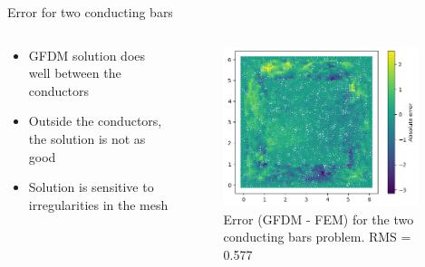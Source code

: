 \documentclass{beamer}
\begin{document}
\begin{frame}{Error for two conducting bars}
\begin{columns}
    \begin{column}{0.5\linewidth}
    \begin{itemize}
        \item GFDM solution does well between the conductors
        \item Outside the conductors, the solution is not as good
        \item Solution is sensitive to irregularities in the mesh
    \end{itemize}
    \end{column}
    \begin{column}{0.5\linewidth}
        \begin{figure}[h]
        \includegraphics[width=0.95\textwidth]{Figures/Bars_Error.png}
        \caption{Error (GFDM - FEM) for the two conducting bars problem. RMS = 0.577}
        \label{fig:two_bars_error}
        \end{figure}
    \end{column}
\end{columns}
\end{frame}
\end{document}
